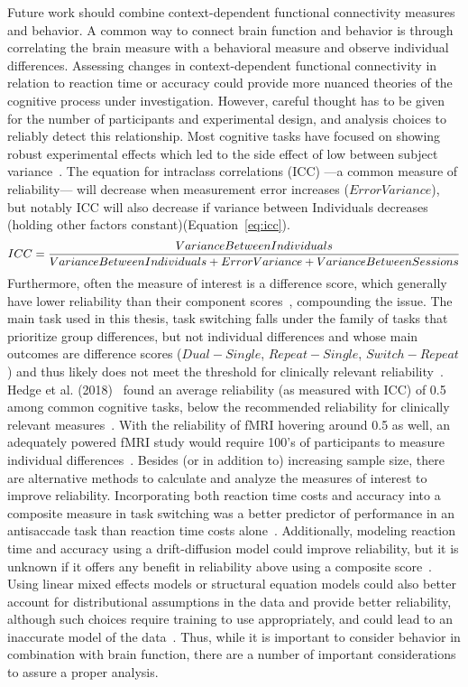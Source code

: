 \documentclass[phd,figures,tables,ackpage,abstractpage,publicabstractpage]{uithesis}
\begin{document}
Future work should combine context-dependent functional connectivity measures and behavior.
A common way to connect brain function and behavior is through correlating the brain measure
with a behavioral measure and observe individual differences.
Assessing changes in context-dependent functional connectivity in relation to reaction time
or accuracy could provide more nuanced theories of the cognitive process under investigation.
However, careful thought has to be given for the number of participants and experimental design,
and analysis choices to reliably detect this relationship.
Most cognitive tasks have focused on showing robust experimental effects which led to the side effect
of low between subject variance~\cite{Hedge2018}.
The equation for intraclass correlations (ICC) ---a common measure of reliability---
will decrease when measurement error increases ($ErrorVariance$),
but notably ICC will also decrease if variance between Individuals
decreases (holding other factors constant)(Equation~\ref{eq:icc}).
\begin{equation}
  \fontsize{10}{12}\selectfont
  ICC = \frac{Variance Between Individuals}{Variance Between Individuals + Error Variance + Variance Between Sessions}
  \label{eq:icc}
\end{equation}
Furthermore, often the measure of interest is a difference score, which
generally have lower reliability than their component scores~\cite{Edwards2001},
compounding the issue.
The main task used in this thesis, task switching falls under the family of tasks that prioritize
group differences, but not individual differences and whose main outcomes are
difference scores ($Dual - Single$, $Repeat - Single$, $Switch - Repeat$) and thus
likely does not meet the threshold for clinically relevant reliability~\cite{Barch2008}.
Hedge et al. (2018)~\cite{Hedge2018} found an average reliability (as measured with ICC)
of 0.5 among common cognitive tasks, below the recommended reliability for clinically relevant measures~\cite{Barch2008}.
With the reliability of fMRI hovering around 0.5 as well, an adequately powered fMRI study
would require 100's of participants to measure individual differences~\cite{Bennett2010,Hedge2018}.
Besides (or in addition to) increasing sample size, there are alternative methods to
calculate and analyze the measures of interest to improve reliability.
Incorporating both reaction time costs and accuracy into a composite measure in task switching was
a better predictor of performance in an antisaccade task than reaction time costs alone~\cite{Hughes2014}.
Additionally, modeling reaction time and accuracy using a drift-diffusion model could improve 
reliability, but it is unknown if it offers any benefit in
reliability above using a composite score~\cite{Schmitz2012,Ratcliff1978,Lerche2017}.
Using linear mixed effects models or structural equation models could also better account
for distributional assumptions in the data and provide better reliability, although
such choices require training to use appropriately, and could lead to an inaccurate
model of the data~\cite{West2008,Bates2015}.
Thus, while it is important to consider behavior in combination with brain function,
there are a number of important considerations to assure a proper analysis.
\end{document}
